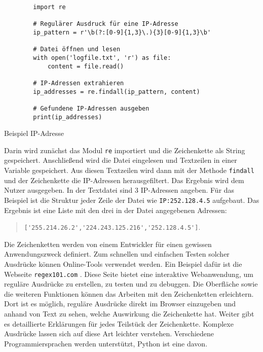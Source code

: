 \begin{listing}[H]
	\begin{verbatim}
		import re
		
		# Regulärer Ausdruck für eine IP-Adresse
		ip_pattern = r'\b(?:[0-9]{1,3}\.){3}[0-9]{1,3}\b'
		
		# Datei öffnen und lesen
		with open('logfile.txt', 'r') as file:
			content = file.read()
		
		# IP-Adressen extrahieren
		ip_addresses = re.findall(ip_pattern, content)
		
		# Gefundene IP-Adressen ausgeben
		print(ip_addresses)
	\end{verbatim}
	\caption{Beispiel IP-Adresse}
	\label{pc:beispiel_regex_ip}
\end{listing}

Darin wird zunächst das Modul \verb*|re| importiert und die Zeichenkette als String gespeichert.
Anschließend wird die Datei eingelesen und Textzeilen in einer Variable gespeichert.
Aus diesen Textzeilen wird dann mit der Methode \verb*|findall| und der Zeichenkette die \acs{IP}-Adressen herausgefiltert.
Das Ergebnis wird dem Nutzer ausgegeben.
In der Textdatei sind 3 \acs{IP}-Adressen angeben.
Für das Beispiel ist die Struktur jeder Zeile der Datei wie \verb*|IP:252.128.4.5| aufgebaut.
Das Ergebnis ist eine Liste mit den drei in der Datei angegebenen Adressen:
\begin{quote}
	\centering
	\verb*|['255.214.26.2','224.243.125.216','252.128.4.5']|.
\end{quote}

Die Zeichenketten werden von einem Entwickler für einen gewissen Anwendungszweck definiert.
Zum schnellen und einfachen Testen solcher Ausdrücke können Online-Tools verwendet werden.
Ein Beispiel dafür ist die Webseite \verb*|regex101.com| \cite{inet:regex101}.
Diese Seite bietet eine interaktive Webanwendung, um reguläre Ausdrücke zu erstellen, zu testen und zu debuggen.
Die Oberfläche sowie die weiteren Funktionen können das Arbeiten mit den Zeichenketten erleichtern.
Dort ist es möglich, reguläre Ausdrücke direkt im Browser einzugeben und anhand von Text zu sehen, welche Auswirkung die Zeichenkette hat.
Weiter gibt es detaillierte Erklärungen für jedes Teilstück der Zeichenkette.
Komplexe Ausdrücke lassen sich auf diese Art leichter verstehen.
Verschiedene Programmiersprachen werden unterstützt, Python ist eine davon. \\

